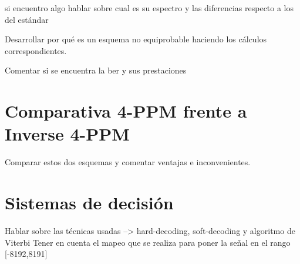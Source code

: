si encuentro algo hablar sobre cual es su espectro y las diferencias respecto a los del estándar

Desarrollar por qué es un esquema no equiprobable haciendo los cálculos correspondientes.

Comentar si se encuentra la ber y sus prestaciones

\section{Comparativa 4-PPM frente a Inverse 4-PPM}
Comparar estos dos esquemas y comentar ventajas e inconvenientes.

\section{Sistemas de decisión}
Hablar sobre las técnicas usadas --> hard-decoding, soft-decoding y algoritmo de Viterbi
Tener en cuenta el mapeo que se realiza para poner la señal en el rango [-8192,8191]

\chapterend{}
